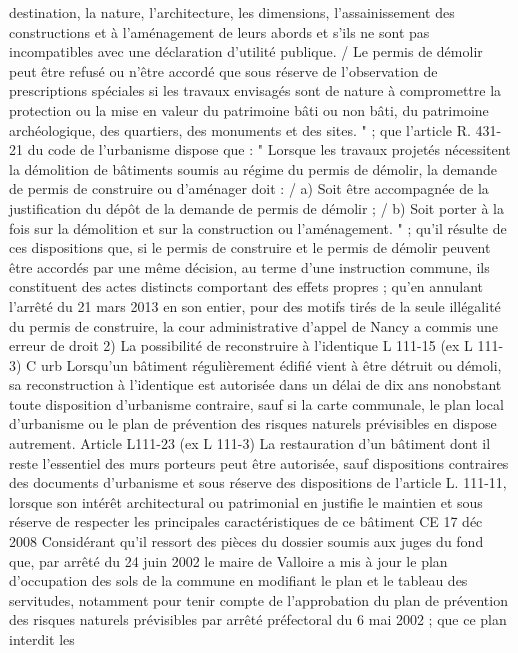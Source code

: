 \documentclass[11pt,a4paper]{report}
\begin{document}
	destination, la nature, l'architecture, les dimensions, l'assainissement des constructions et à l'aménagement de
	leurs abords et s'ils ne sont pas incompatibles avec une déclaration d'utilité publique. / Le permis de démolir
	peut être refusé ou n'être accordé que sous réserve de l'observation de prescriptions spéciales si les travaux
	envisagés sont de nature à compromettre la protection ou la mise en valeur du patrimoine bâti ou non bâti, du
	patrimoine archéologique, des quartiers, des monuments et des sites. " ; que l'article R. 431-21 du code de
	l'urbanisme dispose que : " Lorsque les travaux projetés nécessitent la démolition de bâtiments soumis au
	régime du permis de démolir, la demande de permis de construire ou d'aménager doit : / a) Soit être
	accompagnée de la justification du dépôt de la demande de permis de démolir ; / b) Soit porter à la fois sur la
	démolition et sur la construction ou l'aménagement. " ; qu'il résulte de ces dispositions que, si le permis de
	construire et le permis de démolir peuvent être accordés par une même décision, au terme d'une instruction
	commune, ils constituent des actes distincts comportant des effets propres ; qu'en annulant l'arrêté du 21 mars
	2013 en son entier, pour des motifs tirés de la seule illégalité du permis de construire, la cour administrative
	d'appel de Nancy a commis une erreur de droit
	2) La possibilité de reconstruire à l’identique L 111-15 (ex L 111-3) C urb
	Lorsqu'un bâtiment régulièrement édifié vient à être détruit ou démoli, sa reconstruction à l'identique est
	autorisée dans un délai de dix ans nonobstant toute disposition d'urbanisme contraire, sauf si la carte
	communale, le plan local d'urbanisme ou le plan de prévention des risques naturels prévisibles en dispose
	autrement.
	Article L111-23 (ex L 111-3)
	La restauration d'un bâtiment dont il reste l'essentiel des murs porteurs peut être autorisée, sauf dispositions
	contraires des documents d'urbanisme et sous réserve des dispositions de l'article L. 111-11, lorsque son intérêt
	architectural ou patrimonial en justifie le maintien et sous réserve de respecter les principales caractéristiques
	de ce bâtiment
	CE 17 déc 2008 \no  {} Considérant qu'il ressort des pièces du dossier soumis aux juges du fond que,
	par arrêté du 24 juin 2002 le maire de Valloire a mis à jour le plan d'occupation des sols de la commune en
	modifiant le plan et le tableau des servitudes, notamment pour tenir compte de l'approbation du plan de
	prévention des risques naturels prévisibles par arrêté préfectoral du 6 mai 2002 ; que ce plan interdit les
\end{document}
